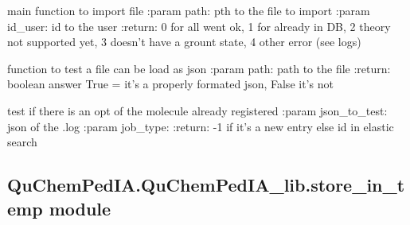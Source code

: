 \documentclass[letterpaper,10pt,english]{sphinxmanual}
\begin{document}
\begin{fulllineitems}
\label{\detokenize{QuChemPedIA.QuChemPedIA_lib:QuChemPedIA.QuChemPedIA_lib.import_file_lib.import_file}}
main function to import file
:param path: pth to the file to import
:param id\_user: id to the user
:return: 0 for all went ok, 1 for already in DB, 2 theory not supported yet,
3 doesn’t have a grount state, 4 other error (see logs)

\end{fulllineitems}


\begin{fulllineitems}
\label{\detokenize{QuChemPedIA.QuChemPedIA_lib:QuChemPedIA.QuChemPedIA_lib.import_file_lib.is_json}}
function to test a file can be load as json
:param path: path to the file
:return: boolean answer True = it’s a properly formated json, False it’s not

\end{fulllineitems}


\begin{fulllineitems}
\label{\detokenize{QuChemPedIA.QuChemPedIA_lib:QuChemPedIA.QuChemPedIA_lib.import_file_lib.is_opt_exist}}
test if there is an opt of the molecule already registered
:param json\_to\_test: json of the .log
:param job\_type:
:return: -1 if it’s a new entry else id in elastic search

\end{fulllineitems}



\subsection{QuChemPedIA.QuChemPedIA\_lib.store\_in\_temp module}
\label{\detokenize{QuChemPedIA.QuChemPedIA_lib:module-QuChemPedIA.QuChemPedIA_lib.store_in_temp}}\label{\detokenize{QuChemPedIA.QuChemPedIA_lib:quchempedia-quchempedia-lib-store-in-temp-module}}
\end{document}
